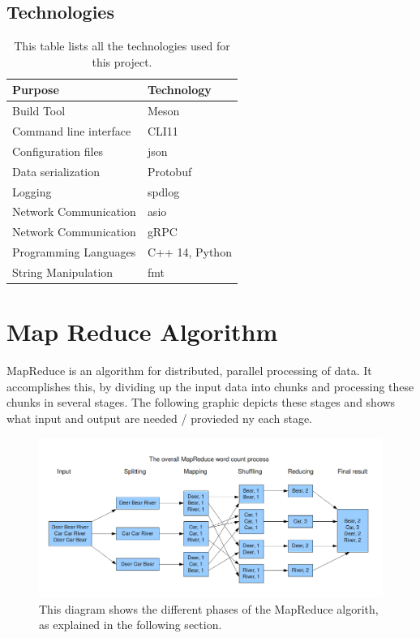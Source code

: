 \documentclass[a4paper]{article}
\begin{document}
\hypertarget{technologies}{%
\subsection{Technologies}\label{technologies}}

\begin{table}[h]
	\centering
	\begin{tabular}{l|l}
		Purpose                       & Technology \\ \hline
		Build Tool				 	  & Meson	   \\
		Command line interface	      & CLI11      \\
		Configuration files           & json       \\
		Data serialization            & Protobuf   \\
		Logging                       & spdlog     \\
		Network Communication         & asio       \\
		Network Communication         & gRPC       \\
		Programming Languages		  & C++ 14, Python \\
		String Manipulation			  & fmt		   
	\end{tabular}
	\caption{This table lists all the technologies used for this project.}
\end{table}

\hypertarget{Map-Reduce-Algorithm}{%
\section{Map Reduce Algorithm}\label{Map Reduce Algorithm}}

MapReduce is an algorithm for distributed, parallel processing of data. It accomplishes this, by dividing up the input data into chunks and processing these chunks in several stages. The following graphic depicts these stages and shows what input and output are needed / provieded ny each stage.

\begin{figure}
\centering
\includegraphics[width=\linewidth]{images/Phases.png}
\caption{This diagram shows the different phases of the MapReduce
algorith, as explained in the following section.}
\end{figure}
\end{document}
